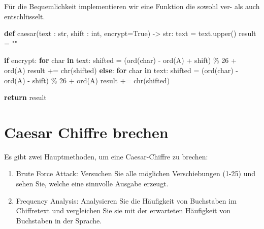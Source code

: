 \documentclass[
  nswissgerman,
  a4paper,
  DIV=11,
  numbers=noendperiod,
  ngerman]{scrreprt}
\newenvironment{Shaded}{\begin{snugshade}}{\end{snugshade}}
\newcommand{\BuiltInTok}[1]{\textcolor[rgb]{0.00,0.23,0.31}{#1}}
\newcommand{\ControlFlowTok}[1]{\textcolor[rgb]{0.00,0.23,0.31}{\textbf{#1}}}
\newcommand{\DecValTok}[1]{\textcolor[rgb]{0.68,0.00,0.00}{#1}}
\newcommand{\KeywordTok}[1]{\textcolor[rgb]{0.00,0.23,0.31}{\textbf{#1}}}
\newcommand{\NormalTok}[1]{\textcolor[rgb]{0.00,0.23,0.31}{#1}}
\newcommand{\OperatorTok}[1]{\textcolor[rgb]{0.37,0.37,0.37}{#1}}
\newcommand{\StringTok}[1]{\textcolor[rgb]{0.13,0.47,0.30}{#1}}
\newcommand{\VariableTok}[1]{\textcolor[rgb]{0.07,0.07,0.07}{#1}}
\providecommand{\tightlist}{%
  \setlength{\itemsep}{0pt}\setlength{\parskip}{0pt}}
\begin{document}
Für die Bequemlichkeit implementieren wir eine Funktion die sowohl ver-
als auch entschlüsselt.

\begin{Shaded}
\begin{Highlighting}[numbers=left,,]
\KeywordTok{def}\NormalTok{ caesar(text : }\BuiltInTok{str}\NormalTok{, shift : }\BuiltInTok{int}\NormalTok{, encrypt}\OperatorTok{=}\VariableTok{True}\NormalTok{) }\OperatorTok{{-}\textgreater{}} \BuiltInTok{str}\NormalTok{:}
\NormalTok{    text }\OperatorTok{=}\NormalTok{ text.upper()}
\NormalTok{    result }\OperatorTok{=} \StringTok{""}
    
    \ControlFlowTok{if}\NormalTok{ encrypt:}
        \ControlFlowTok{for}\NormalTok{ char }\KeywordTok{in}\NormalTok{ text:}
\NormalTok{            shifted }\OperatorTok{=}\NormalTok{ (}\BuiltInTok{ord}\NormalTok{(char) }\OperatorTok{{-}} \BuiltInTok{ord}\NormalTok{(}\StringTok{\textquotesingle{}A\textquotesingle{}}\NormalTok{) }\OperatorTok{+}\NormalTok{ shift) }\OperatorTok{\%} \DecValTok{26} \OperatorTok{+} \BuiltInTok{ord}\NormalTok{(}\StringTok{\textquotesingle{}A\textquotesingle{}}\NormalTok{)}
\NormalTok{            result }\OperatorTok{+=} \BuiltInTok{chr}\NormalTok{(shifted)}
    \ControlFlowTok{else}\NormalTok{:}
        \ControlFlowTok{for}\NormalTok{ char }\KeywordTok{in}\NormalTok{ text:}
\NormalTok{            shifted }\OperatorTok{=}\NormalTok{ (}\BuiltInTok{ord}\NormalTok{(char) }\OperatorTok{{-}} \BuiltInTok{ord}\NormalTok{(}\StringTok{\textquotesingle{}A\textquotesingle{}}\NormalTok{) }\OperatorTok{{-}}\NormalTok{ shift) }\OperatorTok{\%} \DecValTok{26} \OperatorTok{+} \BuiltInTok{ord}\NormalTok{(}\StringTok{\textquotesingle{}A\textquotesingle{}}\NormalTok{)}
\NormalTok{            result }\OperatorTok{+=} \BuiltInTok{chr}\NormalTok{(shifted)}
            
    \ControlFlowTok{return}\NormalTok{ result}
\end{Highlighting}
\end{Shaded}

\section{Caesar Chiffre brechen}\label{caesar-chiffre-brechen}

Es gibt zwei Hauptmethoden, um eine Caesar-Chiffre zu brechen:

\begin{enumerate}
\def\labelenumi{\arabic{enumi}.}
\tightlist
\item
  Brute Force Attack: Versuchen Sie alle möglichen Verschiebungen (1-25)
  und sehen Sie, welche eine sinnvolle Ausgabe erzeugt.
\item
  Frequency Analysis: Analysieren Sie die Häufigkeit von Buchstaben im
  Chiffretext und vergleichen Sie sie mit der erwarteten Häufigkeit von
  Buchstaben in der Sprache.
\end{enumerate}
\end{document}
